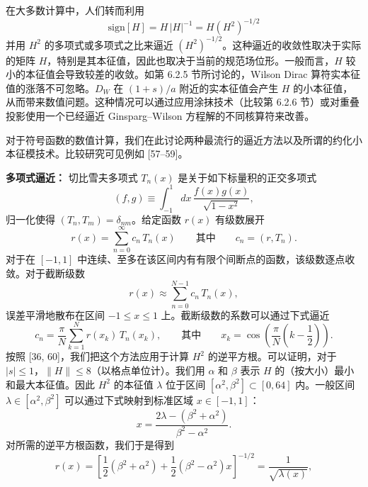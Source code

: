 在大多数计算中，人们转而利用
\begin{equation}
  \mathrm{sign}[H] = H\,|H|^{-1} = H\left(H^2\right)^{-1/2}
\end{equation}
并用 $H^2$ 的多项式或多项式之比来逼近 $(H^2)^{-1/2}$。这种逼近的收敛性取决于实际的矩阵 $H$，特别是其本征值，因此也取决于当前的规范场位形。一般而言，$H$ 较小的本征值会导致较差的收敛。如第 6.2.5 节所讨论的，Wilson Dirac 算符实本征值的涨落不可忽略。$D_W$ 在 $(1+s)/a$ 附近的实本征值会产生 $H$ 的小本征值，从而带来数值问题。这种情况可以通过应用涂抹技术（比较第 6.2.6 节）或对重叠投影使用一个已经逼近 Ginsparg--Wilson 方程解的不同核算符来改善。

对于符号函数的数值计算，我们在此讨论两种最流行的逼近方法以及所谓的约化小本征模技术。比较研究可见例如 [57--59]。

\textbf{多项式逼近：} 切比雪夫多项式 $T_n(x)$ 是关于如下标量积的正交多项式
\begin{equation}
  (f, g) \equiv \int_{-1}^{1} dx\,\frac{f(x)g(x)}{\sqrt{1-x^2}},
\end{equation}
归一化使得 $(T_n, T_m) = \delta_{nm}$。给定函数 $r(x)$ 有级数展开
\begin{equation}
  r(x) = \sum_{n=0}^{\infty} c_n\,T_n(x) \qquad \text{其中} \qquad
  c_n = (r, T_n) .
\end{equation}
对于在 $[-1, 1]$ 中连续、至多在该区间内有有限个间断点的函数，该级数逐点收敛。对于截断级数
\begin{equation}
  r(x) \approx \sum_{n=0}^{N-1} c_n\,T_n(x),
\end{equation}
误差平滑地散布在区间 $-1 \leq x \leq 1$ 上。截断级数的系数可以通过下式逼近
\begin{equation}
  c_n = \frac{\pi}{N}\sum_{k=1}^{N} r(x_k)\,T_n(x_k),
  \qquad \text{其中} \qquad
  x_k = \cos\!\left(\frac{\pi}{N}\left(k-\frac{1}{2}\right)\right) .
\end{equation}
按照 [36, 60]，我们把这个方法应用于计算 $H^2$ 的逆平方根。可以证明，对于 $|s| \leq 1$，$\|H\| \leq 8$（以格点单位计）。我们用 $\alpha$ 和 $\beta$ 表示 $H$ 的（按大小）最小和最大本征值。因此 $H^2$ 的本征值 $\lambda$ 位于区间 $[\alpha^2, \beta^2] \subset [0, 64]$ 内。一般区间 $\lambda \in [\alpha^2, \beta^2]$ 可以通过下式映射到标准区域 $x \in [-1, 1]$：
\begin{equation}
  x = \frac{2\lambda - (\beta^2 + \alpha^2)}{\beta^2 - \alpha^2} .
\end{equation}
对所需的逆平方根函数，我们于是得到
\begin{equation}
  r(x) = \left[\frac{1}{2}(\beta^2+\alpha^2) + \frac{1}{2}(\beta^2-\alpha^2)x\right]^{-1/2}
  = \frac{1}{\sqrt{\lambda(x)}},
\end{equation}
